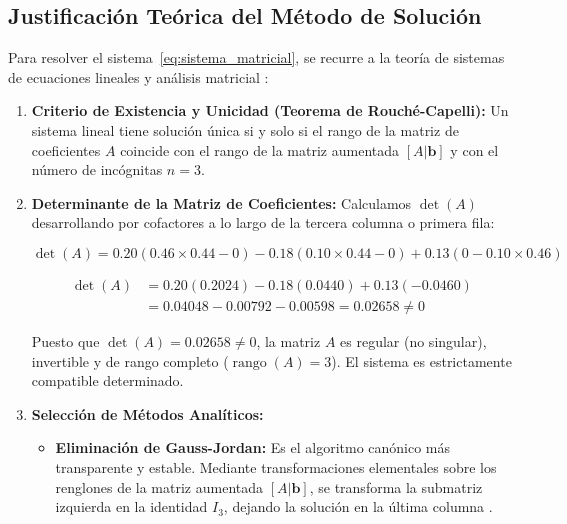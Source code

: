 \subsection{Justificación Teórica del Método de Solución}

Para resolver el sistema~\eqref{eq:sistema_matricial}, se recurre a la teoría de sistemas de ecuaciones lineales y análisis matricial \parencite{grossman2019, lay2016, strang2016}:

\begin{enumerate}

    \item \textbf{Criterio de Existencia y Unicidad (Teorema de Rouché-Capelli):} Un sistema lineal tiene solución única si y solo si el rango de la matriz de coeficientes $A$ coincide con el rango de la matriz aumentada $[A|\mathbf{b}]$ y con el número de incógnitas $n=3$.

    \item \textbf{Determinante de la Matriz de Coeficientes:} Calculamos $\det(A)$ desarrollando por cofactores a lo largo de la tercera columna o primera fila:

\begin{equation}
\det(A) = 0.20(0.46 \times 0.44 - 0) - 0.18(0.10 \times 0.44 - 0) + 0.13(0 - 0.10 \times 0.46)
\end{equation}

\begin{equation}
\begin{aligned}
\det(A) &= 0.20(0.2024) - 0.18(0.0440) + 0.13(-0.0460) \\
&= 0.04048 - 0.00792 - 0.00598 = 0.02658 \neq 0
\end{aligned}
\end{equation}

    Puesto que $\det(A) = 0.02658 \neq 0$, la matriz $A$ es regular (no singular), invertible y de rango completo ($\operatorname{rango}(A) = 3$). El sistema es estrictamente compatible determinado.

    \item \textbf{Selección de Métodos Analíticos:}

    \begin{itemize}

        \item \textbf{Eliminación de Gauss-Jordan:} Es el algoritmo canónico más transparente y estable. Mediante transformaciones elementales sobre los renglones de la matriz aumentada $[A|\mathbf{b}]$, se transforma la submatriz izquierda en la identidad $I_3$, dejando la solución en la última columna \parencite{anton2014}.


\end{itemize}
\end{enumerate}
